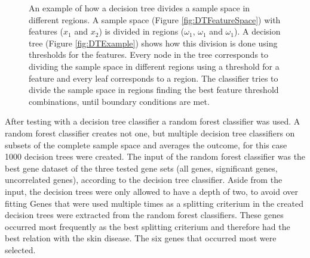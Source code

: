 \documentclass[10pt,a4paper]{report}
\begin{document}
	\begin{figure}[H]
		\centering
		\hfill
		\caption{An example of how a decision tree divides a sample space in different regions. A sample space (Figure \ref{fig:DTFeatureSpace}) with features ($x_1$ and $x_2$) is divided in regions ($\omega_1$, $\omega_1$ and $\omega_1$). A decision tree (Figure \ref{fig:DTExample}) shows how this division is done using thresholds for the features. Every node in the tree corresponds to dividing the sample space in different regions using a threshold for a feature and every leaf corresponds to a region. The classifier tries to divide the sample space in regions finding the best feature threshold combinations, until boundary conditions are met.}
		\label{fig:DecisionTree}
	\end{figure}
	
	After testing with a decision tree classifier a random forest classifier was used. A random forest classifier creates not one, but multiple decision tree classifiers on subsets of the complete sample space and averages the outcome, for this case 1000 decision trees were created. The input of the random forest classifier was the best gene dataset of the three tested gene sets (all genes, significant genes, uncorrelated genes), according to the decision tree classifier. Aside from the input, the decision trees were only allowed to have a depth of two, to avoid over fitting Genes that were used multiple times as a splitting criterium in the created decision trees were extracted from the random forest classifiers. These genes occurred most frequently as the best splitting criterium and therefore had the best relation with the skin disease. The six genes that occurred most were selected.
	
\end{document}
